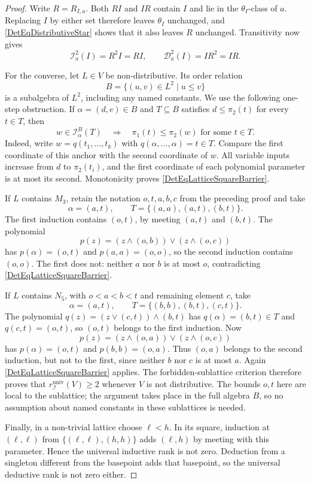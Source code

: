 \documentclass[12pt,english]{amsart}
\theoremstyle{definition}
\numberwithin{equation}{section}
\theoremstyle{remark}
\begin{document}
\begin{proof}
Write $R=R_{I,a}$. Both $RI$ and $IR$ contain $I$ and lie in the
$\theta_I$-class of $a$. Replacing $I$ by either set therefore leaves
$\theta_I$ unchanged, and \eqref{DetEqDistributiveStar} shows that it
also leaves $R$ unchanged. Transitivity now gives
\[
\mathcal I_a^2(I)=R^2I=RI,
\qquad
\mathcal D_a^2(I)=IR^2=IR.
\]

For the converse, let $L\in V$ be non-distributive. Its order relation
\[
B=\{(u,v)\in L^2\mid u\leqslant v\}
\]
is a subalgebra of $L^2$, including any named constants. We use the
following one-step obstruction. If $\alpha=(d,e)\in B$ and
$T\subseteq B$ satisfies $d\leqslant\pi_2(t)$ for every $t\in T$,
then
\begin{equation}\label{DetEqLatticeSquareBarrier}
w\in\mathcal I_\alpha^B(T)
\quad\Longrightarrow\quad
\pi_1(t)\leqslant\pi_2(w)\text{ for some }t\in T.
\end{equation}
Indeed, write $w=q(t_1,\ldots,t_k)$ with
$q(\alpha,\ldots,\alpha)=t\in T$. Compare the first coordinate of
this anchor with the second coordinate of $w$. All variable inputs
increase from $d$ to $\pi_2(t_i)$, and the first coordinate of each
polynomial parameter is at most its second. Monotonicity proves
\eqref{DetEqLatticeSquareBarrier}.

If $L$ contains $M_3$, retain the notation $o,t,a,b,c$ from the
preceding proof and take
\[
\alpha=(a,t),\qquad
T=\{(a,a),(a,t),(b,t)\}.
\]
The first induction contains $(o,t)$, by meeting $(a,t)$ and $(b,t)$.
The polynomial
\[
p(z)=(z\wedge(o,b))\vee(z\wedge(o,c))
\]
has $p(\alpha)=(o,t)$ and $p(a,a)=(o,o)$, so the second induction
contains $(o,o)$. The first does not: neither $a$ nor $b$ is at most
$o$, contradicting \eqref{DetEqLatticeSquareBarrier}.

If $L$ contains $N_5$, with $o<a<b<t$ and remaining element $c$, take
\[
\alpha=(a,t),\qquad
T=\{(b,b),(b,t),(c,t)\}.
\]
The polynomial $q(z)=(z\vee(c,t))\wedge(b,t)$ has
$q(\alpha)=(b,t)\in T$ and $q(c,t)=(o,t)$, so $(o,t)$ belongs to
the first induction. Now
\[
p(z)=(z\wedge(o,a))\vee(z\wedge(o,c))
\]
has $p(\alpha)=(o,t)$ and $p(b,b)=(o,a)$. Thus $(o,a)$ belongs to
the second induction, but not to the first, since neither $b$ nor
$c$ is at most $a$. Again \eqref{DetEqLatticeSquareBarrier} applies.
The forbidden-sublattice criterion therefore proves that
$r_{\mathcal I}^{\mathrm{univ}}(V)\geqslant2$ whenever $V$ is not
distributive. The bounds $o,t$ here are local to the sublattice;
the argument takes place in the full algebra $B$, so no assumption
about named constants in these sublattices is needed.

Finally, in a non-trivial lattice choose $\ell<h$. In its square,
induction at $(\ell,\ell)$ from
$\{(\ell,\ell),(h,h)\}$ adds $(\ell,h)$ by meeting with this
parameter. Hence the universal inductive rank is not zero.
Deduction from a singleton different from the basepoint adds that
basepoint, so the universal deductive rank is not zero either.
\end{proof}
\end{document}
